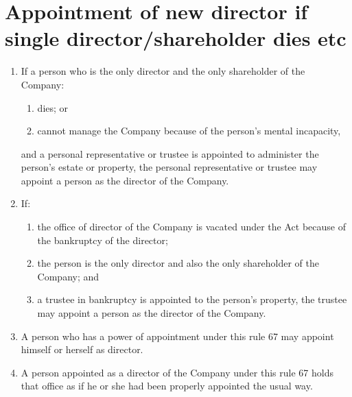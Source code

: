 \section{Appointment of new director if single director/shareholder dies etc}

\begin{enumerate}[label=(\alph*)]
    \item If a person who is the only director and the only shareholder of the Company:
    \begin{enumerate}[label=(\roman*)]
        \item dies; or
        \item cannot manage the Company because of the person's mental incapacity,
    \end{enumerate}
    
    and a personal representative or trustee is appointed to administer the person's estate or property, the personal representative or trustee may appoint a person as the director of the Company.
    
    \item If:
    \begin{enumerate}[label=(\roman*)]
        \item the office of director of the Company is vacated under the Act because of the bankruptcy of the director;
        \item the person is the only director and also the only shareholder of the Company; and
        \item a trustee in bankruptcy is appointed to the person's property, the trustee may appoint a person as the director of the Company.
    \end{enumerate}
    
    \item A person who has a power of appointment under this rule 67 may appoint himself or herself as director.
    
    \item A person appointed as a director of the Company under this rule 67 holds that office as if he or she had been properly appointed the usual way.
\end{enumerate} 
